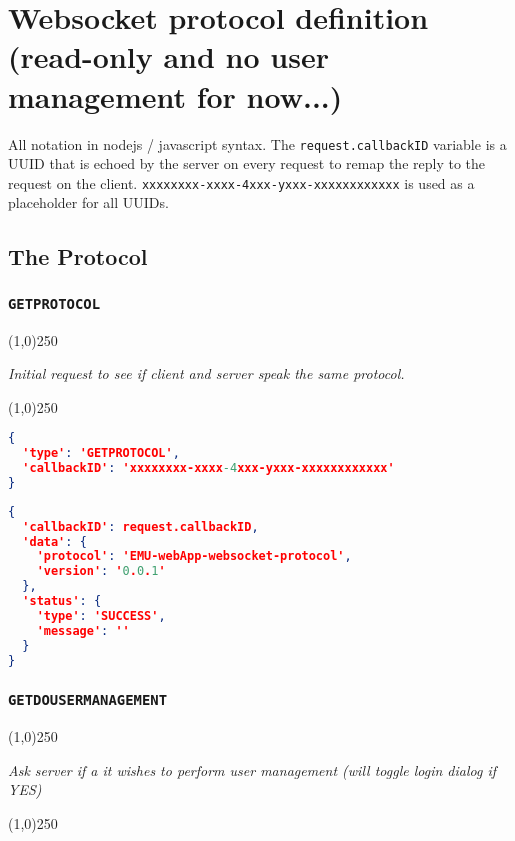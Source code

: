 \documentclass[A4,12pt, utf8]{article}
\begin{document}
\clearpage

\section{Websocket protocol definition (read-only and no user management for now...)}

All notation in nodejs / javascript syntax. The \texttt{request.callbackID} variable is a UUID that is echoed by the server on every request to remap the reply to the request on the client. \texttt{xxxxxxxx-xxxx-4xxx-yxxx-xxxxxxxxxxxx} is used as a placeholder for all UUIDs.


\subsection{The Protocol}

\subsubsection{\texttt{GETPROTOCOL}}
\begin{center}
  \line(1,0){250}

  \textit{Initial request to see if client and server speak the same protocol.}

  \line(1,0){250}
\end{center}


\begin{lstlisting}[caption=Request content, language=json]
{
  'type': 'GETPROTOCOL', 
  'callbackID': 'xxxxxxxx-xxxx-4xxx-yxxx-xxxxxxxxxxxx'
}
\end{lstlisting}

\begin{lstlisting}[caption=Reply content, language=json]
{
  'callbackID': request.callbackID,
  'data': {
    'protocol': 'EMU-webApp-websocket-protocol',
    'version': '0.0.1'
  },
  'status': {
    'type': 'SUCCESS',
    'message': ''
  }
}
\end{lstlisting}

\subsubsection{\texttt{GETDOUSERMANAGEMENT}}
\begin{center}
  \line(1,0){250}

  \textit{Ask server if a it wishes to perform user management (will toggle login dialog if YES)}

  \line(1,0){250}
\end{center}
\end{document}
